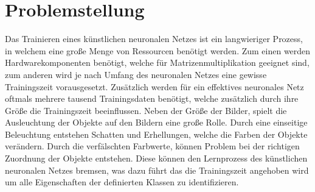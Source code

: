 \documentclass[a4paper,12pt,oneside]{article}
\begin{document}
  \newpage
  \pagestyle{plain}
  \setcounter{page}{1}
  
  \tableofcontents
  
  \newpage
  
  \section{Problemstellung}
  Das Trainieren eines künstlichen neuronalen Netzes ist ein langwieriger Prozess, in welchem 
  eine große Menge von Ressourcen benötigt werden. Zum einen werden Hardwarekomponenten benötigt, 
  welche für Matrizenmultiplikation geeignet sind, zum anderen wird je nach Umfang des 
  neuronalen Netzes eine gewisse Trainingszeit vorausgesetzt. Zusätzlich werden für ein 
  effektives neuronales Netz oftmals mehrere tausend Trainingsdaten benötigt, welche zusätzlich 
  durch ihre Größe die Trainingszeit beeinflussen. Neben der Größe der Bilder, spielt die  
  Ausleuchtung der Objekte auf den Bildern eine große Rolle. Durch eine einseitige Beleuchtung 
  entstehen Schatten und Erhellungen, welche die Farben der Objekte verändern. Durch 
  die verfälschten Farbwerte, können Problem bei der richtigen Zuordnung der Objekte entstehen. 
  Diese können den Lernprozess des künstlichen neuronalen Netzes bremsen, was dazu führt das die 
  Trainingszeit angehoben wird um alle Eigenschaften der definierten Klassen zu identifizieren.
  \vspace{1 cm}
\end{document}
